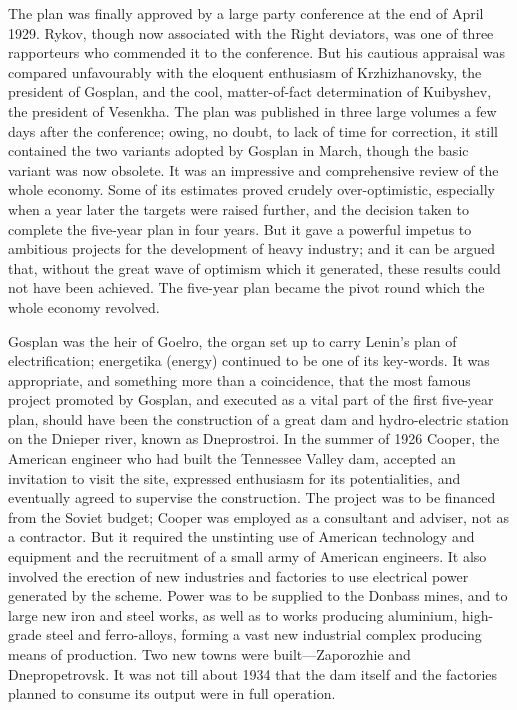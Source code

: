 The plan was finally approved by a large party conference at the end of April 1929. Rykov, though now associated with the Right deviators, was one of three rapporteurs who commended it to the conference. But his cautious appraisal was compared unfavourably with the eloquent enthusiasm of Krzhizhanovsky, the president of Gosplan, and the cool, matter-of-fact determination of Kuibyshev, the president of Vesenkha. The plan was published in three large volumes a few days after the conference; owing, no doubt, to lack of time for correction, it still contained the two variants adopted by Gosplan in March, though the basic variant was now obsolete. It was an impressive and comprehensive review of the whole economy. Some of its estimates proved crudely over-optimistic, especially when a year later the targets were raised further, and the decision taken to complete the five-year plan in four years. But it gave a powerful impetus to ambitious projects for the development of heavy industry; and it can be argued that, without the great wave of optimism which it generated, these results could not have been achieved. The five-year plan became the pivot round which the whole economy revolved. 

Gosplan was the heir of Goelro, the organ set up to carry Lenin's plan of electrification; energetika (energy) continued to be one of its key-words. It was appropriate, and something more than a coincidence, that the most famous project promoted by Gosplan, and executed as a vital part of the first five-year plan, should have been the construction of a great dam and hydro-electric station on the Dnieper river, known as Dneprostroi. In the summer of 1926 Cooper, the American engineer who had built the Tennessee Valley dam, accepted an invitation to visit the site, expressed enthusiasm for its potentialities, and eventually agreed to supervise the construction. The project was to be financed from the Soviet budget; Cooper was employed as a consultant and adviser, not as a contractor. But it required the unstinting use of American technology and equipment and the recruitment of a small army of American engineers. It also involved the erection of new industries and factories to use electrical power generated by the scheme. Power was to be supplied to the Donbass mines, and to large new iron and steel works, as well as to works producing aluminium, high-grade steel and ferro-alloys, forming a vast new industrial complex producing means of production. Two new towns were built---Zaporozhie and Dnepropetrovsk. It was not till about 1934 that the dam itself and the factories planned to consume its output were in full operation. 

